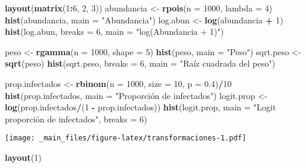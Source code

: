 \documentclass[
]{book}
\newenvironment{Shaded}{\begin{snugshade}}{\end{snugshade}}
\newcommand{\DataTypeTok}[1]{\textcolor[rgb]{0.13,0.29,0.53}{#1}}
\newcommand{\DecValTok}[1]{\textcolor[rgb]{0.00,0.00,0.81}{#1}}
\newcommand{\FloatTok}[1]{\textcolor[rgb]{0.00,0.00,0.81}{#1}}
\newcommand{\KeywordTok}[1]{\textcolor[rgb]{0.13,0.29,0.53}{\textbf{#1}}}
\newcommand{\NormalTok}[1]{#1}
\newcommand{\OperatorTok}[1]{\textcolor[rgb]{0.81,0.36,0.00}{\textbf{#1}}}
\newcommand{\StringTok}[1]{\textcolor[rgb]{0.31,0.60,0.02}{#1}}
\begin{document}
\begin{Shaded}
\begin{Highlighting}[]
\KeywordTok{layout}\NormalTok{(}\KeywordTok{matrix}\NormalTok{(}\DecValTok{1}\OperatorTok{:}\DecValTok{6}\NormalTok{, }\DecValTok{2}\NormalTok{, }\DecValTok{3}\NormalTok{))}
\NormalTok{abundancia <-}\StringTok{ }\KeywordTok{rpois}\NormalTok{(}\DataTypeTok{n =} \DecValTok{1000}\NormalTok{, }\DataTypeTok{lambda =} \DecValTok{4}\NormalTok{)}
\KeywordTok{hist}\NormalTok{(abundancia, }\DataTypeTok{main =} \StringTok{"Abundancia"}\NormalTok{)}
\NormalTok{log.abun <-}\StringTok{ }\KeywordTok{log}\NormalTok{(abundancia }\OperatorTok{+}\StringTok{ }\DecValTok{1}\NormalTok{)}
\KeywordTok{hist}\NormalTok{(log.abun, }\DataTypeTok{breaks =} \DecValTok{6}\NormalTok{, }\DataTypeTok{main =} \StringTok{"log(Abundancia + 1)"}\NormalTok{)}

\NormalTok{peso <-}\StringTok{ }\KeywordTok{rgamma}\NormalTok{(}\DataTypeTok{n =} \DecValTok{1000}\NormalTok{, }\DataTypeTok{shape =} \DecValTok{5}\NormalTok{)}
\KeywordTok{hist}\NormalTok{(peso, }\DataTypeTok{main =} \StringTok{"Peso"}\NormalTok{)}
\NormalTok{sqrt.peso <-}\StringTok{ }\KeywordTok{sqrt}\NormalTok{(peso)}
\KeywordTok{hist}\NormalTok{(sqrt.peso, }\DataTypeTok{breaks =} \DecValTok{6}\NormalTok{, }\DataTypeTok{main =} \StringTok{"Raíz cuadrada del peso"}\NormalTok{)}

\NormalTok{prop.infectados <-}\StringTok{ }\KeywordTok{rbinom}\NormalTok{(}\DataTypeTok{n =} \DecValTok{1000}\NormalTok{, }\DataTypeTok{size =} \DecValTok{10}\NormalTok{, }\DataTypeTok{p =} \FloatTok{0.4}\NormalTok{)}\OperatorTok{/}\DecValTok{10}
\KeywordTok{hist}\NormalTok{(prop.infectados, }\DataTypeTok{main =} \StringTok{"Proporción de infectados"}\NormalTok{)}
\NormalTok{logit.prop <-}\StringTok{ }\KeywordTok{log}\NormalTok{(prop.infectados}\OperatorTok{/}\NormalTok{(}\DecValTok{1} \OperatorTok{-}\StringTok{ }\NormalTok{prop.infectados))}
\KeywordTok{hist}\NormalTok{(logit.prop, }\DataTypeTok{main =} \StringTok{"Logit proporción de infectados"}\NormalTok{, }\DataTypeTok{breaks =} \DecValTok{6}\NormalTok{)}
\end{Highlighting}
\end{Shaded}

\texttt{[image: \_main\_files/figure-latex/transformaciones-1.pdf]}

\begin{Shaded}
\begin{Highlighting}[]
\KeywordTok{layout}\NormalTok{(}\DecValTok{1}\NormalTok{)}
\end{Highlighting}
\end{Shaded}
\end{document}
